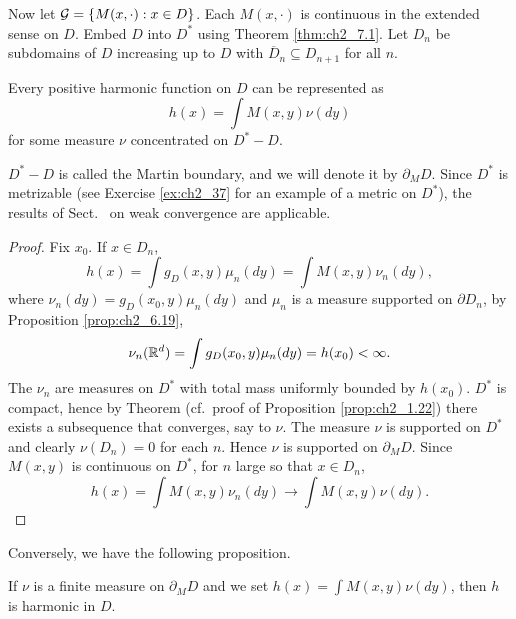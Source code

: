 Now let $\mathcal{G} = \{M(x,\cdot) : x \in D\}$. Each $M(x,\cdot)$ is continuous in the extended sense on $D$. Embed $D$ into $D^*$ using Theorem \ref{thm:ch2_7.1}. Let $D_n$ be subdomains of $D$ increasing up to $D$ with $\overline{D}_n \subseteq D_{n+1}$ for all $n$.

\begin{theorem}\label{thm:ch2_7.2}
Every positive harmonic function on $D$ can be represented as
\begin{equation}\label{eq:ch2_7.2}
    h(x) = \int M(x,y)\nu(dy)
\end{equation}
for some measure $\nu$ concentrated on $D^* - D$.
\end{theorem}

$D^* - D$ is called the Martin boundary, and we will denote it by $\partial_M D$. Since $D^*$ is metrizable (see Exercise \ref{ex:ch2_37} for an example of a metric on $D^*$), the results of Sect.\  on weak convergence are applicable.

\begin{proof}
Fix $x_0$. If $x \in D_n$,
\[
    h(x) = \int g_D(x,y)\mu_n(dy) = \int M(x,y)\nu_n(dy),
\]
where $\nu_n(dy) = g_D(x_0,y)\mu_n(dy)$ and $\mu_n$ is a measure supported on $\partial D_n$, by Proposition \ref{prop:ch2_6.19}, %
\[
    \nu_n(\mathbb{R}^d) = \int g_D(x_0,y)\mu_n(dy) = h(x_0) < \infty.
\]
The $\nu_n$ are measures on $D^*$ with total mass uniformly bounded by $h(x_0)$. $D^*$ is compact, hence by Theorem  (cf.\ proof of Proposition \ref{prop:ch2_1.22}) there exists a subsequence that converges, say to $\nu$. The measure $\nu$ is supported on $D^*$ and clearly $\nu(D_n) = 0$ for each $n$. Hence $\nu$ is supported on $\partial_M D$. Since $M(x,y)$ is continuous on $D^*$, for $n$ large so that $x \in D_n$,
\[
    h(x) = \int M(x,y)\nu_n(dy) \to \int M(x,y)\nu(dy).
\]
\end{proof}

Conversely, we have the following proposition.

\begin{proposition}\label{prop:ch2_7.3}
If $\nu$ is a finite measure on $\partial_M D$ and we set $h(x) = \int M(x,y)\nu(dy)$, then $h$ is harmonic in $D$.
\end{proposition}

